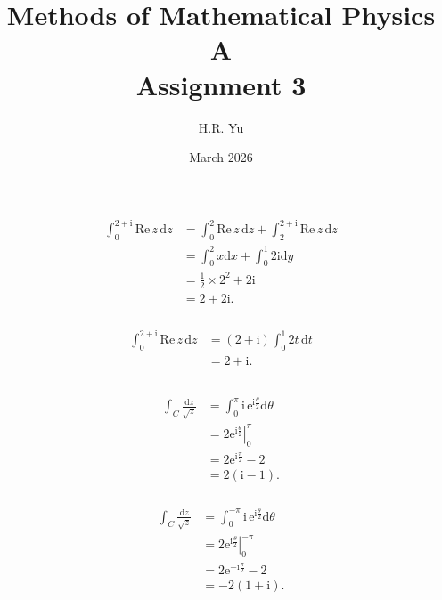 \documentclass[12pt]{article}
\title{Methods of Mathematical Physics A\\Assignment 3}
\author{H.R. Yu}
\date{March 2026}
\newcommand{\de}[1]{\mathrm{d}#1}
\newcommand{\mrm}[1]{\mathrm{#1}}
\begin{document}
\maketitle

\section{}
\subsection{}
\subsubsection{}
\begin{align*}
\int_{0}^{2+\mathrm{i}} \mathrm{Re}\,z\,\mathrm{d}z &= \int_{0}^{2} \mathrm{Re}\,z\,\mathrm{d}z + \int_{2}^{2+\mathrm{i}} \mathrm{Re}\,z\,\mathrm{d}z \\
&= \int_0^2 x\de x+\int_0^{1}2\mrm i \de y\\
&= \frac{1}{2} \times 2^2 + 2 \mrm i \\
&= 2+2 \mrm i.
\end{align*}
\subsubsection{}
\begin{align*}
\int_{0}^{2+\mathrm{i}} \mathrm{Re}\,z\,\mathrm{d}z &= (2+\mathrm{i}) \int_{0}^{1} 2t\,\mathrm{d}t \\
&= 2+\mathrm{i}.
\end{align*}
\subsection{}
\subsubsection{}
\begin{align*}
\int_{C} \frac{\mathrm{d}z}{\sqrt{z}} &= \int_{0}^{\pi} \mathrm{i}\,\mathrm{e}^{\mathrm{i}\frac{\theta}{2}} \mathrm{d}\theta \\
&= \left. 2\mathrm{e}^{\mathrm{i}\frac{\theta}{2}} \right\vert_{0}^{\pi} \\
&= 2\mathrm{e}^{\mathrm{i}\frac{\pi}{2}} - 2 \\
&= 2(\mathrm{i} - 1).
\end{align*}
\subsubsection{}
\begin{align*}
\int_{C} \frac{\mathrm{d}z}{\sqrt{z}} &= \int_{0}^{-\pi} \mathrm{i}\,\mathrm{e}^{\mathrm{i}\frac{\theta}{2}} \mathrm{d}\theta \\
&= \left. 2\mathrm{e}^{\mathrm{i}\frac{\theta}{2}} \right\vert_{0}^{-\pi} \\
&= 2\mathrm{e}^{-\mathrm{i}\frac{\pi}{2}} - 2 \\
&= -2(1+\mathrm{i}).
\end{align*}
\end{document}
